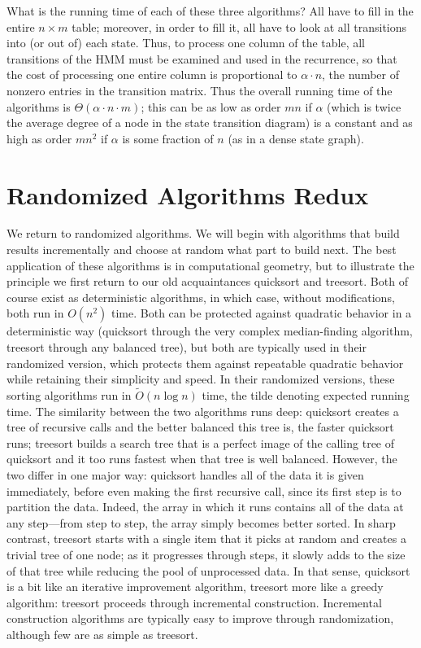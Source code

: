 \documentclass[11pt]{article}
\begin{document}
What is the running time of each of these three algorithms?  All have to
fill in the entire $n\times m$ table; moreover, in order to fill it,
all have to look at all transitions into (or out of) each state.  Thus,
to process one column of the table, all transitions of the HMM must be
examined and used in the recurrence, so that the cost of processing one
entire column is proportional to $\alpha\cdot n$, the number of nonzero
entries in the transition matrix.  Thus the overall running time of the
algorithms is $\Theta(\alpha\cdot n\cdot m)$; this can be as low as
order $mn$ if $\alpha$ (which is twice the average degree of a node in the
state transition diagram) is a constant and as high as order $mn^2$ if
$\alpha$ is some fraction of $n$ (as in a dense state graph).

\section{Randomized Algorithms Redux}
We return to randomized algorithms.  We will begin with algorithms
that build results incrementally and choose at random what part to build
next.  The best application of these algorithms is in computational geometry,
but to illustrate the principle we first return to our old acquaintances
quicksort and treesort.  Both of course exist as deterministic algorithms,
in which case, without modifications, both run in $O(n^2)$ time.  Both
can be protected against quadratic behavior in a deterministic way (quicksort
through the very complex median-finding algorithm, treesort through any
balanced tree), but both are typically used in their randomized version,
which protects them against repeatable quadratic behavior while retaining
their simplicity and speed.   In their randomized versions, these sorting
algorithms run in $\tilde{O}(n\log n)$ time, the tilde denoting expected
running time.  The similarity between the two algorithms runs deep:
quicksort creates a tree of recursive calls and the better balanced
this tree is, the faster quicksort runs; treesort builds a search tree
that is a perfect image of the calling tree of quicksort and it too runs
fastest when that tree is well balanced.  However, the two differ in one
major way: quicksort handles all of the data it is given immediately,
before even making the first recursive call, since its first step
is to partition the data.  Indeed, the array in which it runs contains
all of the data at any step---from step to step, the array simply becomes
better sorted.  In sharp contrast, treesort starts with a single item that
it picks at random and creates a trivial tree of one node; as it progresses
through steps, it slowly adds to the size of that tree while reducing the
pool of unprocessed data.  In that sense, quicksort is a bit like an
iterative improvement algorithm, treesort more like a greedy algorithm:
treesort proceeds through incremental construction.  Incremental construction
algorithms are typically easy to improve through randomization, although
few are as simple as treesort.
\end{document}
